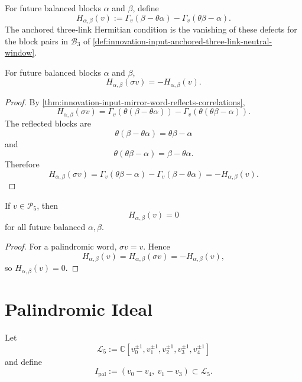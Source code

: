 \begin{definition}
\label{def:innovation-input-pairwise-hermitian-defect}
For future balanced blocks $\alpha$ and $\beta$, define
$$
H_{\alpha,\beta}(v)
:=
\Gamma_v(\beta-\theta\alpha)
-
\Gamma_v(\theta\beta-\alpha).
$$
The anchored three-link Hermitian condition is the vanishing of these
defects for the block pairs in $\mathcal B_3$ of
\autoref{def:innovation-input-anchored-three-link-neutral-window}.
\end{definition}

\begin{theorem}
\label{thm:innovation-input-hermitian-defects-mirror-odd}
For future balanced blocks $\alpha$ and $\beta$,
$$
H_{\alpha,\beta}(\sigma v)=-H_{\alpha,\beta}(v).
$$
\end{theorem}

\begin{proof}
By
\autoref{thm:innovation-input-mirror-word-reflects-correlations},
$$
H_{\alpha,\beta}(\sigma v)
=
\Gamma_v(\theta(\beta-\theta\alpha))
-
\Gamma_v(\theta(\theta\beta-\alpha)).
$$
The reflected blocks are
$$
\theta(\beta-\theta\alpha)=\theta\beta-\alpha
$$
and
$$
\theta(\theta\beta-\alpha)=\beta-\theta\alpha.
$$
Therefore
$$
H_{\alpha,\beta}(\sigma v)
=
\Gamma_v(\theta\beta-\alpha)
-
\Gamma_v(\beta-\theta\alpha)
=
-H_{\alpha,\beta}(v).
$$
\end{proof}

\begin{corollary}
\label{cor:innovation-input-hermitian-defects-vanish-palindromic}
If $v\in\mathcal P_5$, then
$$
H_{\alpha,\beta}(v)=0
$$
for all future balanced $\alpha,\beta$.
\end{corollary}

\begin{proof}
For a palindromic word, $\sigma v=v$. Hence
$$
H_{\alpha,\beta}(v)
=
H_{\alpha,\beta}(\sigma v)
=
-H_{\alpha,\beta}(v),
$$
so $H_{\alpha,\beta}(v)=0$.
\end{proof}

\section{Palindromic Ideal}
\label{sec:innovation-input-palindromic-ideal}

\begin{definition}
\label{def:innovation-input-palindromic-laurent-ideal}
Let
$$
\mathcal L_5
:=
\mathbb C[v_0^{\pm1},v_1^{\pm1},v_2^{\pm1},v_3^{\pm1},v_4^{\pm1}]
$$
and define
$$
I_{\mathrm{pal}}
:=
(v_0-v_4,\ v_1-v_3)
\subset\mathcal L_5.
$$
\end{definition}

